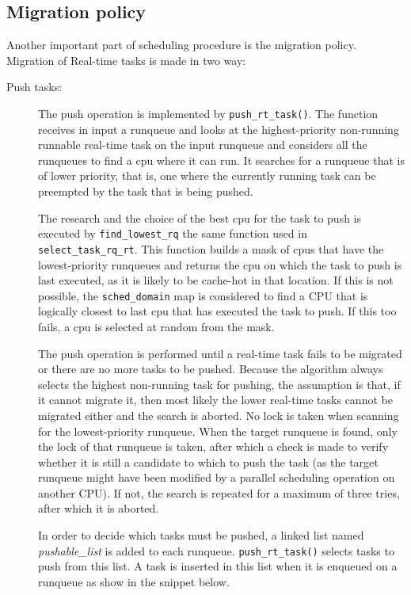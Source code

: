 \subsection{Migration policy}

Another important part of scheduling procedure is the migration policy. Migration of Real-time tasks is made in two way: 

\begin{description}
\item[Push tasks:] The push operation is implemented by \texttt{push\_rt\_task()}. The function receives in input a runqueue and looks at the 
highest-priority non-running runnable real-time task on the input runqueue and considers all the runqueues to find a cpu where it can run. It searches for 
a runqueue that is of lower priority, that is, one where the currently running task can be preempted by the task that is being pushed. 

The research and the choice of the best cpu for the task to push is executed by \texttt{find\_lowest\_rq} the same function used in 
\texttt{select\_task\_rq\_rt}. This function builds a mask of cpus that have the lowest-priority runqueues and returns the cpu on which the task to push is 
last executed, as it is likely to be cache-hot in that location. If this is not possible, the \texttt{sched\_domain} map is considered to find a CPU that 
is logically closest to last cpu that has executed the task to push. If this too fails, a cpu is selected at random from the mask.

The push operation is performed until a real-time task fails to be migrated or there are no more tasks to be pushed. Because the algorithm always selects 
the highest non-running task for pushing, the assumption is that, if it cannot migrate it, then most likely the lower real-time tasks cannot be migrated 
either and the search is aborted. No lock is taken when scanning for the lowest-priority runqueue. When the target runqueue is found, only the lock of that 
runqueue is taken, after which a check is made to verify whether it is still a candidate to which to push the task (as the target runqueue might have been 
modified by a parallel scheduling operation on another CPU). If not, the search is repeated for a maximum of three tries, after which it is aborted. 

In order to decide which tasks must be pushed, a linked list named \textit{pushable\_list} is added to each runqueue. \texttt{push\_rt\_task()} selects tasks
to push from this list. A task is inserted in this list when it is enqueued on a runqueue as show in the snippet below.


\end{description}
